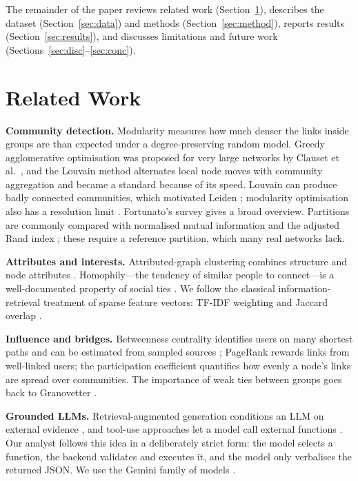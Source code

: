 \documentclass[conference]{IEEEtran}
\begin{document}
The remainder of the paper reviews related work (Section~\ref{sec:related}), describes the dataset (Section~\ref{sec:data}) and methods (Section~\ref{sec:method}), reports results (Section~\ref{sec:results}), and discusses limitations and future work (Sections~\ref{sec:disc}--\ref{sec:conc}).

\section{Related Work}\label{sec:related}
\textbf{Community detection.} Modularity \cite{newman2006} measures how much denser the links inside groups are than expected under a degree-preserving random model. Greedy agglomerative optimisation was proposed for very large networks by Clauset et al.\ \cite{clauset2004}, and the Louvain method \cite{blondel2008} alternates local node moves with community aggregation and became a standard because of its speed. Louvain can produce badly connected communities, which motivated Leiden \cite{traag2019}; modularity optimisation also has a resolution limit \cite{fortunato2007}. Fortunato's survey \cite{fortunato2010} gives a broad overview. Partitions are commonly compared with normalised mutual information \cite{danon2005} and the adjusted Rand index \cite{hubert1985}; these require a reference partition, which many real networks lack.

\textbf{Attributes and interests.} Attributed-graph clustering combines structure and node attributes \cite{bothorel2015}. Homophily---the tendency of similar people to connect---is a well-documented property of social ties \cite{mcpherson2001}. We follow the classical information-retrieval treatment of sparse feature vectors: TF-IDF weighting \cite{salton1988} and Jaccard overlap \cite{jaccard1901}.

\textbf{Influence and bridges.} Betweenness centrality \cite{freeman1977} identifies users on many shortest paths and can be estimated from sampled sources \cite{brandes2007}; PageRank \cite{page1999} rewards links from well-linked users; the participation coefficient \cite{guimera2005} quantifies how evenly a node's links are spread over communities. The importance of weak ties between groups goes back to Granovetter \cite{granovetter1973}.

\textbf{Grounded LLMs.} Retrieval-augmented generation conditions an LLM on external evidence \cite{lewis2020}, and tool-use approaches let a model call external functions \cite{schick2023}. Our analyst follows this idea in a deliberately strict form: the model selects a function, the backend validates and executes it, and the model only verbalises the returned JSON. We use the Gemini family of models \cite{gemini2023}.
\end{document}
